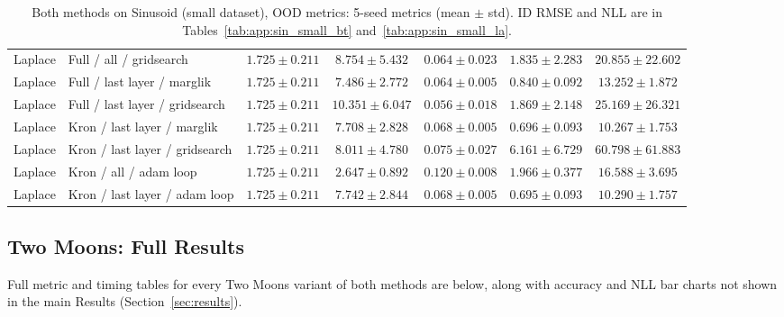 \documentclass[conference]{IEEEtran}
\begin{document}
\begin{table}[!t]
{\begin{tabular}{llccccc}
Laplace & Full / all / gridsearch & $1.725 \pm 0.211$ & $8.754 \pm 5.432$ & $0.064 \pm 0.023$ & $1.835 \pm 2.283$ & $20.855 \pm 22.602$ \\
Laplace & Full / last layer / marglik & $1.725 \pm 0.211$ & $7.486 \pm 2.772$ & $0.064 \pm 0.005$ & $0.840 \pm 0.092$ & $13.252 \pm 1.872$ \\
Laplace & Full / last layer / gridsearch & $1.725 \pm 0.211$ & $10.351 \pm 6.047$ & $\bm{0.056 \pm 0.018}$ & $1.869 \pm 2.148$ & $25.169 \pm 26.321$ \\
Laplace & Kron / last layer / marglik & $1.725 \pm 0.211$ & $7.708 \pm 2.828$ & $0.068 \pm 0.005$ & $0.696 \pm 0.093$ & $10.267 \pm 1.753$ \\
Laplace & Kron / last layer / gridsearch & $1.725 \pm 0.211$ & $8.011 \pm 4.780$ & $0.075 \pm 0.027$ & $6.161 \pm 6.729$ & $60.798 \pm 61.883$ \\
Laplace & Kron / all / adam loop & $1.725 \pm 0.211$ & $2.647 \pm 0.892$ & $0.120 \pm 0.008$ & $1.966 \pm 0.377$ & $16.588 \pm 3.695$ \\
Laplace & Kron / last layer / adam loop & $1.725 \pm 0.211$ & $7.742 \pm 2.844$ & $0.068 \pm 0.005$ & $0.695 \pm 0.093$ & $10.290 \pm 1.757$ \\
\bottomrule
\end{tabular}}
\caption{Both methods on Sinusoid (small dataset), OOD metrics: 5-seed metrics (mean $\pm$ std). ID RMSE and NLL are in Tables~\ref{tab:app:sin_small_bt} and~\ref{tab:app:sin_small_la}.}
\label{tab:app:sin_small_ood}
\end{table}

\subsection{Two Moons: Full Results}

Full metric and timing tables for every Two Moons variant of both methods are below, along
with accuracy and NLL bar charts not shown in the main Results (Section~\ref{sec:results}).
\end{document}
